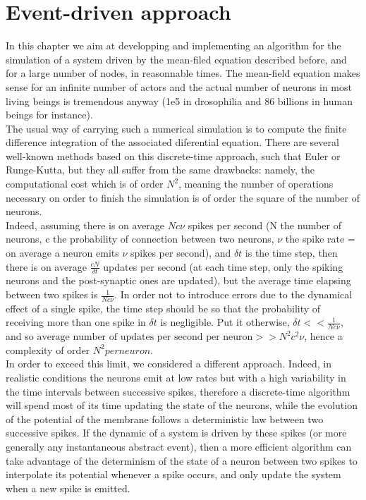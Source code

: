 \section{Event-driven approach}
	In this chapter we aim at developping and implementing an algorithm for the simulation of a system driven by the mean-filed equation described before, and for a large number of nodes, in reasonnable times. The mean-field equation makes sense for an infinite number of actors and the actual number of neurons in most living beings is tremendous anyway (1e5 in drosophilia and 86 billions in human beings for instance).\\
	The usual way of carrying such a numerical simulation is to compute the finite difference integration of the associated diferential equation. There are several well-known methods based on this discrete-time approach, such that Euler or Runge-Kutta, but they all suffer from the same drawbacks: namely, the computational cost which is of order $N^2$, meaning the number of operations necessary on order to finish the simulation is of order the square of the number of neurons.\\
	Indeed, assuming there is on average $Nc\nu$ spikes per second (N the number of neurons, c the probability of connection between two neurons, $\nu$ the spike rate = on average a neuron emits $\nu$ spikes per second), and $\delta t$ is the time step, then there is on average $\frac{cN}{\delta t}$ updates per second (at each time step, only the spiking neurons and the post-synaptic ones are updated), but the average time elapsing between two spikes is $\frac{1}{Nc\nu}$. In order not to introduce errors due to the dynamical effect of a single spike, the time step should be so that the probability of receiving more than one spike in $\delta t$ is negligible. Put it otherwise, $\delta t<<\frac{1}{Nc\nu}$, and so $\text{average number of updates per second per neuron}>>N^2c^2\nu$, hence a complexity of order $N^2 per neuron$.\\
	In order to exceed this limit, we considered a different approach. Indeed, in realistic conditions the neurons emit at low rates but with a high variability in the time intervals between successive spikes, therefore a discrete-time algorithm will spend most of its time updating the state of the neurons, while the evolution of the potential of the membrane follows a deterministic law between two successive spikes. If the dynamic of a system is driven by these spikes (or more generally any instantaneous abstract event), then a more efficient algorithm can take advantage of the determinism of the state of a neuron between two spikes to interpolate its potential whenever a spike occurs, and only update the system when a new spike is emitted.\\
